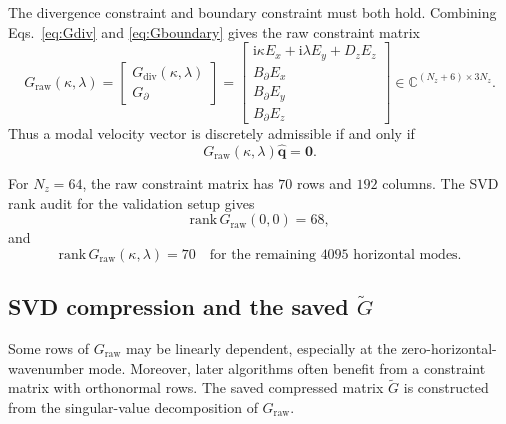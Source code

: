 \documentclass[11pt]{article}
\newcommand{\ii}{\mathrm{i}}
\newcommand{\bfq}{\bm{q}}
\newcommand{\bfzero}{\bm{0}}
\newcommand{\Graw}{G_{\mathrm{raw}}}
\newcommand{\Gdiv}{G_{\mathrm{div}}}
\newcommand{\Gbdry}{G_{\partial}}
\newcommand{\Gtilde}{\widetilde{G}}
\newcommand{\Ez}{E_z}
\newcommand{\Ex}{E_x}
\newcommand{\Ey}{E_y}
\newcommand{\Dz}{D_z}
\newcommand{\Bbdry}{B_{\partial}}
\begin{document}
The divergence constraint and boundary constraint must both hold. Combining
Eqs.~\eqref{eq:Gdiv} and \eqref{eq:Gboundary} gives the raw constraint matrix
\begin{equation}
  \Graw(\kappa,\lambda)
  =
  \begin{bmatrix}
    \Gdiv(\kappa,\lambda)\\
    \Gbdry
  \end{bmatrix}
  =
  \begin{bmatrix}
    \ii\kappa\Ex+\ii\lambda\Ey+\Dz\Ez\\
    \Bbdry\Ex\\
    \Bbdry\Ey\\
    \Bbdry\Ez
  \end{bmatrix}
  \in\mathbb{C}^{(N_z+6)\times 3N_z}.
  \label{eq:Graw}
\end{equation}
Thus a modal velocity vector is discretely admissible if and only if
\begin{equation}
  \Graw(\kappa,\lambda)\widehat{\bfq}=\bfzero.
  \label{eq:raw_constraint_equation}
\end{equation}

For \(N_z=64\), the raw constraint matrix has \(70\) rows and \(192\) columns.
The SVD rank audit for the validation setup gives
\[
  \mathrm{rank}\,\Graw(0,0)=68,
\]
and
\[
  \mathrm{rank}\,\Graw(\kappa,\lambda)=70
  \quad\text{for the remaining }4095\text{ horizontal modes}.
\]

\subsection{SVD compression and the saved \texorpdfstring{\(\Gtilde\)}{Gtilde}}

Some rows of \(\Graw\) may be linearly dependent, especially at the
zero-horizontal-wavenumber mode. Moreover, later algorithms often benefit from
a constraint matrix with orthonormal rows. The saved compressed matrix
\(\Gtilde\) is constructed from the singular-value decomposition of
\(\Graw\).
\end{document}
